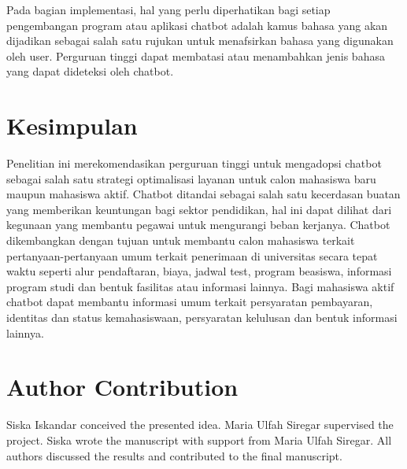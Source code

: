 \documentclass[conference]{IEEEtran}
\begin{document}
Pada bagian implementasi, hal yang perlu diperhatikan bagi setiap pengembangan program atau aplikasi chatbot adalah kamus bahasa yang akan dijadikan sebagai salah satu rujukan untuk menafsirkan bahasa yang digunakan oleh user. Perguruan tinggi dapat membatasi atau menambahkan jenis bahasa yang dapat dideteksi oleh chatbot. 

\section{Kesimpulan}
Penelitian ini merekomendasikan perguruan tinggi untuk mengadopsi chatbot sebagai salah satu strategi optimalisasi layanan untuk calon mahasiswa baru maupun mahasiswa aktif. Chatbot ditandai sebagai salah satu kecerdasan buatan yang memberikan keuntungan bagi sektor pendidikan, hal ini dapat dilihat dari kegunaan yang membantu pegawai untuk mengurangi beban kerjanya. Chatbot dikembangkan dengan tujuan untuk membantu calon mahasiswa terkait pertanyaan-pertanyaan umum terkait penerimaan di universitas secara tepat waktu seperti alur pendaftaran, biaya, jadwal test, program beasiswa, informasi program studi dan bentuk fasilitas atau informasi lainnya. Bagi mahasiswa aktif chatbot dapat membantu informasi umum terkait persyaratan pembayaran, identitas dan status kemahasiswaan, persyaratan kelulusan dan bentuk informasi lainnya.

\section*{Author Contribution}
Siska Iskandar conceived the presented idea. Maria Ulfah Siregar supervised the project. Siska wrote the manuscript with support from Maria Ulfah Siregar. All authors discussed the results and contributed to the final manuscript.
\end{document}

